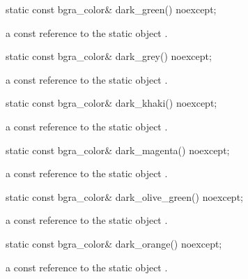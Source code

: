 \begin{itemdecl}
static const bgra_color& dark_green() noexcept;
\end{itemdecl}
\begin{itemdescr}
\pnum
\returns
a const reference to the static  object .
\end{itemdescr}

\begin{itemdecl}
static const bgra_color& dark_grey() noexcept;
\end{itemdecl}
\begin{itemdescr}
\pnum
\returns
a const reference to the static  object .
\end{itemdescr}

\begin{itemdecl}
static const bgra_color& dark_khaki() noexcept;
\end{itemdecl}
\begin{itemdescr}
\pnum
\returns
a const reference to the static  object .
\end{itemdescr}

\begin{itemdecl}
static const bgra_color& dark_magenta() noexcept;
\end{itemdecl}
\begin{itemdescr}
\pnum
\returns
a const reference to the static  object .
\end{itemdescr}

\begin{itemdecl}
static const bgra_color& dark_olive_green() noexcept;
\end{itemdecl}
\begin{itemdescr}
\pnum
\returns
a const reference to the static  object .
\end{itemdescr}

\begin{itemdecl}
static const bgra_color& dark_orange() noexcept;
\end{itemdecl}
\begin{itemdescr}
\pnum
\returns
a const reference to the static  object .
\end{itemdescr}

